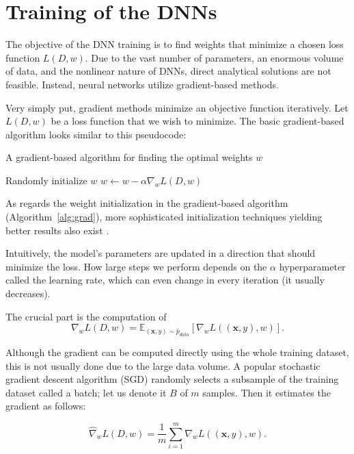 \section{Training of the DNNs}

The objective of the DNN training is to find weights that minimize a chosen loss function $L(D, w)$. Due to the vast number of parameters, an enormous volume of data, and the nonlinear nature of DNNs, direct analytical solutions are not feasible. Instead, neural networks utilize gradient-based methods.

Very simply put, gradient methods minimize an objective function iteratively. Let $L(D, w)$ be a loss function that we wish to minimize. The basic gradient-based algorithm looks similar to this pseudocode:


\begin{algorithm}[H]
\begin{algorithmic}
	\caption{A gradient-based algorithm for finding the optimal weights $w$}\label{alg:grad}
	\State Randomly initialize $w$
		\State $w \gets w - \alpha \nabla_w L(D, w)$
	\EndWhile
\end{algorithmic}
\end{algorithm}

As regards the weight initialization in the gradient-based algorithm (Algorithm~\ref{alg:grad}), more sophisticated initialization techniques yielding better results also exist \citep{glorot2010understanding}.

Intuitively, the model’s parameters are updated in a direction that should minimize the loss. How large steps we perform depends on the $\alpha$ hyperparameter called the learning rate, which can even change in every iteration (it usually decreases).

The crucial part is the computation of
\begin{equation}
	\nabla_w L(D, w) = \mathbb{E}_{(\textbf{x}, y) \sim \hat{p}_{data}} [ \nabla_w L((\textbf{x}, y), w) ].
\end{equation}

Although the gradient can be computed directly using the whole training dataset, this is not usually done due to the large data volume. A popular stochastic gradient descent algorithm (SGD) \citep{kiefer1952stochastic} randomly selects a subsample of the training dataset called a batch; let us denote it $B$ of $m$ samples. Then it estimates the gradient as follows:

\begin{equation}
	\hat{\nabla}_w L(D, w) = \frac{1}{m} \sum_{i=1}^m \nabla_w L((\textbf{x}, y), w).
\end{equation}
 


